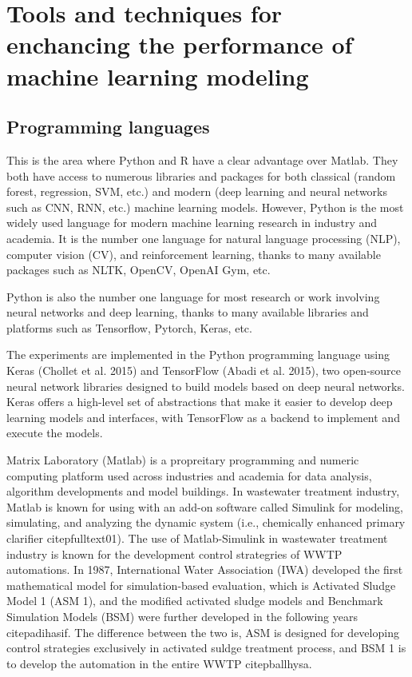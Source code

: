 \citep{kehreinCriticalReviewResource2020}

\section{Tools and techniques for enchancing the performance of machine learning modeling}
\subsection{Programming languages}


This is the area where Python and R have a clear advantage over Matlab. They both have access to numerous libraries and packages for both classical (random forest, regression, SVM, etc.) and modern (deep learning and neural networks such as CNN, RNN, etc.) machine learning models. However, Python is the most widely used language for modern machine learning research in industry and academia. It is the number one language for natural language processing (NLP), computer vision (CV), and reinforcement learning, thanks to many available packages such as NLTK, OpenCV, OpenAI Gym, etc.

Python is also the number one language for most research or work involving neural networks and deep learning, thanks to many available libraries and platforms such as Tensorflow, Pytorch, Keras, etc. \citep{tadayonPythonVsVs2020}


The experiments are implemented in the Python programming language using Keras (Chollet et al. 2015) and TensorFlow (Abadi et al. 2015), two open-source neural network libraries designed to build models based on deep neural networks. Keras offers a high-level set of abstractions that make it easier to develop deep learning models and interfaces, with TensorFlow as a backend to implement and execute the models. \citep{mamandipoorMonitoringDetectingFaults2020}


Matrix Laboratory (Matlab) is a propreitary programming and numeric computing platform used across industries and academia for data analysis, algorithm developments and model buildings. In wastewater treatment industry, Matlab is known for using with an add-on software called Simulink for modeling, simulating, and analyzing the dynamic system (i.e., chemically enhanced primary clarifier citep{fulltext01}). The use of Matlab-Simulink in wastewater treatment industry is known for the development control strategries of WWTP automations. In 1987, International Water Association (IWA) developed the first mathematical model for simulation-based evaluation, which is Activated Sludge Model 1 (ASM 1), and the modified activated sludge models and Benchmark Simulation Models (BSM) were further developed in the following years citep{adihasif}. The difference between the two is, ASM is designed for developing control strategies exclusively in activated suldge treatment process, and BSM 1 is to develop the automation in the entire WWTP citep{ballhysa}. 
 
